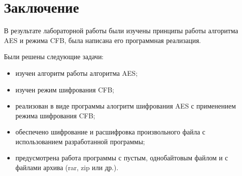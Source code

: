 \chapter*{Заключение}

В результате лабораторной работы были изучены принципы работы алгоритма AES и режима CFB, была написана его программная реализация.

Были решены следующие задачи:
\begin{itemize}[label=---]
	\item изучен алгоритм работы алгоритма AES;
	\item изучен режим шифрования CFB;
	\item реализован в виде программы алогритм шифрования AES с применением режима шифрования CFB;
	\item обеспечено шифрование и расшифровка произвольного файла с использованием разработанной программы;
	\item предусмотрена работа программы с пустым, однобайтовым файлом и с файлами архива (rar, zip или др.).
\end{itemize}
